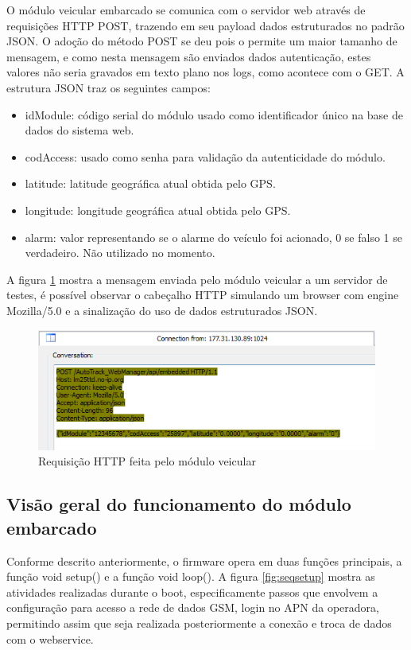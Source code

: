 O módulo veicular embarcado se comunica com o servidor web através de requisições HTTP POST, trazendo em seu
payload dados estruturados no padrão JSON. O adoção do método POST se deu pois o permite um maior tamanho de
mensagem, e como nesta mensagem são enviados dados autenticação, estes valores não seria gravados em texto
plano nos logs, como acontece com o GET. A estrutura JSON traz os seguintes campos:

\begin{itemize}
	\item idModule: código serial do módulo usado como identificador único na base de dados do sistema web.
	\item codAccess: usado como senha para validação da autenticidade do módulo.
	\item latitude: latitude geográfica atual obtida pelo GPS.
	\item longitude: longitude geográfica atual obtida pelo GPS.
	\item alarm: valor representando se o alarme do veículo foi acionado, 0 se falso 1 se verdadeiro. Não utilizado no momento.
\end{itemize}

A figura \ref{fig:requisicaohttp} mostra a mensagem enviada pelo módulo veicular a um servidor de testes, é possível observar o cabeçalho HTTP simulando um browser com engine Mozilla/5.0 e a sinalização do uso de dados estruturados JSON.

\begin{figure}[!htb]
	\centering
	\includegraphics[width=\textwidth]{figures/requisicao_post.png}
	\caption{Requisição HTTP feita pelo módulo veicular}
	\label{fig:requisicaohttp}
\end{figure}

\subsection {Visão geral do funcionamento do módulo embarcado}

Conforme descrito anteriormente, o firmware opera em duas funções principais, a função void setup() e a função void loop(). A figura \ref{fig:seqsetup} mostra as atividades realizadas durante o boot, especificamente passos que envolvem a configuração para acesso a rede de dados GSM, login no APN da operadora, permitindo assim que seja realizada posteriormente a conexão e troca de dados com o webservice.

